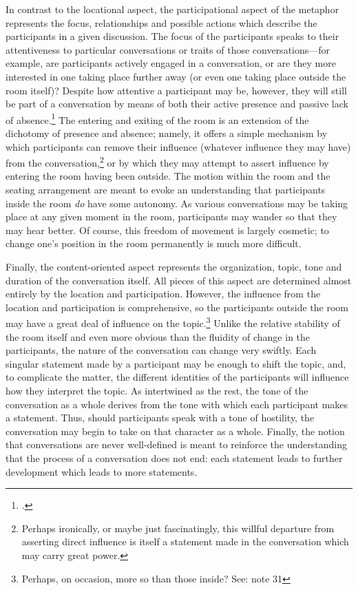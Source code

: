 \documentclass{article}
\begin{document}
In contrast to the locational aspect, the participational aspect of the metaphor represents the focus, relationships and possible actions which describe the participants in a given discussion.
The focus of the participants speaks to their attentiveness to particular conversations or traits of those conversations---for example, are participants actively engaged in a conversation, or are they more interested in one taking place further away (or even one taking place outside the room itself)?
Despite how attentive a participant may be, however, they will still be part of a conversation by means of both their active presence and passive lack of absence.\footcite{bickford96,giddens86}
The entering and exiting of the room is an extension of the dichotomy of presence and absence; namely, it offers a simple mechanism by which participants can remove their influence (whatever influence they may have) from the conversation,\footnote{Perhaps ironically, or maybe just fascinatingly, this willful departure from asserting direct influence is itself a statement made in the conversation which may carry great power.} or by which they may attempt to assert influence by entering the room having been outside.
The motion within the room and the seating arrangement are meant to evoke an understanding that participants inside the room \emph{do} have some autonomy.
As various conversations may be taking place at any given moment in the room, participants may wander so that they may hear better.
Of course, this freedom of movement is largely cosmetic; to change one's position in the room permanently is much more difficult.

Finally, the content-oriented aspect represents the organization, topic, tone and duration of the conversation itself.
All pieces of this aspect are determined almost entirely by the location and participation.
However, the influence from the location and participation is comprehensive, so the participants outside the room may have a great deal of influence on the topic.\footnote{Perhaps, on occasion, more so than those inside? See: note 31}
Unlike the relative stability of the room itself and even more obvious than the fluidity of change in the participants, the nature of the conversation can change very swiftly.
Each singular statement made by a participant may be enough to shift the topic, and, to complicate the matter, the different identities of the participants will influence how they interpret the topic.
As intertwined as the rest, the tone of the conversation as a whole derives from the tone with which each participant makes a statement.
Thus, should participants speak with a tone of hostility, the conversation may begin to take on that character as a whole.
Finally, the notion that conversations are never well-defined is meant to reinforce the understanding that the process of a conversation does not end: each statement leads to further development which leads to more statements.
\end{document}
